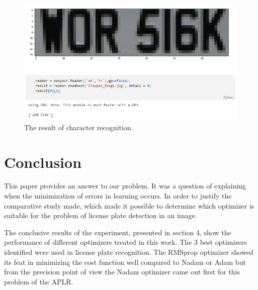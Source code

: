 \documentclass[lnbip]{svmultln}
\begin{document}
	\begin{figure}[H]%
		\centering
		\includegraphics[width=\textwidth]{images/ocr_result}
		\caption{The result of character recognition.}
		\label{fig:ocr_result}
	\end{figure}
	
	
	\section{Conclusion}
	
	This paper provides an answer to our problem. It was a question of explaining when the minimization of errors in learning occurs. In order to justify the comparative study made, which made it possible to determine which optimizer is suitable for the problem of license plate detection in an image.
	
	The conclusive results of the experiment, presented in section 4, show the performance of different optimizers treated in this work. The 3 best optimizers identified were used in license plate recognition. The RMSprop optimizer showed its feat in minimizing the cost function well compared to Nadam or Adam but from the precision point of view the Nadam optimizer came out first for this problem of the APLR.
	
	



%



%
%
%
\nocite{*}

%
\end{document}

